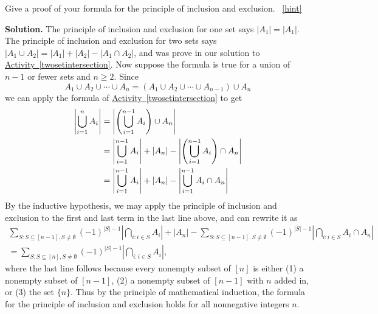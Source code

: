 \documentclass{book}
\begin{document}
\setcounter{project}{223}
\addtocounter{project}{-1}
\begin{activity}[]\label{activity-216}
\hypertarget{p-1250}{}%
Give a proof of your formula for the principle of inclusion and exclusion.%
~\hfill{\tiny\hyperlink{a-223}{[hint]}\hypertarget{q-223}{}}\par\smallskip%
\noindent\textbf{Solution.}\hypertarget{solution-150}{}\quad%
\hypertarget{p-1253}{}%
The principle of inclusion and exclusion for one set says \(|A_1| = |A_1|\).  The principle of inclusion and exclusion for two sets says \(|A_1\cup A_2| = |A_1| + |A_2| - |A_1 \cap A_2|\), and was prove in our solution to \hyperref[twosetintersection]{Activity~\ref{twosetintersection}}.  Now suppose the formula is true for a union of \(n-1\) or fewer sets and \(n \ge 2\).  Since%
\begin{equation*}
A_1 \cup A_2 \cup \cdots \cup A_n = \left(A_1 \cup A_2 \cup \cdots \cup A_{n-1}\right) \cup A_n
\end{equation*}
we can apply the formula of \hyperref[twosetintersection]{Activity~\ref{twosetintersection}} to get%
\begin{align*}
\left|\bigcup_{i=1}^n A_i \right| & = \left|\left(\bigcup_{i=1}^{n-1} A_i\right) \cup A_n \right| \\
& = \left| \bigcup_{i=1}^{n-1} A_i\right| + |A_n| - \left|\left( \bigcup_{i=1}^{n-1} A_i\right) \cap A_n\right|\\
& = \left| \bigcup_{i=1}^{n-1} A_i\right| + |A_n| - \left|\bigcup_{i=1}^{n-1} A_i \cap A_n\right|
\end{align*}
By the inductive hypothesis, we may apply the principle of inclusion and exclusion to the first and last term in the last line above, and can rewrite it as%
\begin{gather*}
\sum_{S:S\subseteq [n-1],S\ne \emptyset} (-1)^{|S|-1}\left|\bigcap_{i:i\in S}A_i \right| + |A_n| - \sum_{S:S\subseteq [n-1],S\ne \emptyset} (-1)^{|S|-1}\left|\bigcap_{i:i\in S}A_i \cap A_n \right|\\
= \sum_{S:S\subseteq [n],S\ne \emptyset} (-1)^{|S|-1}\left|\bigcap_{i:i\in S}A_i \right|,
\end{gather*}
where the last line follows because every nonempty subset of \([n]\) is either (1) a nonempty subset of \([n-1]\), (2) a nonempty subset of \([n-1]\) with  \(n\) added in, or (3) the set \(\{n\}\).  Thus by the principle of mathematical induction, the formula for the principle of inclusion and exclusion holds for all nonnegative integers \(n\).%
\end{activity}
\end{document}
